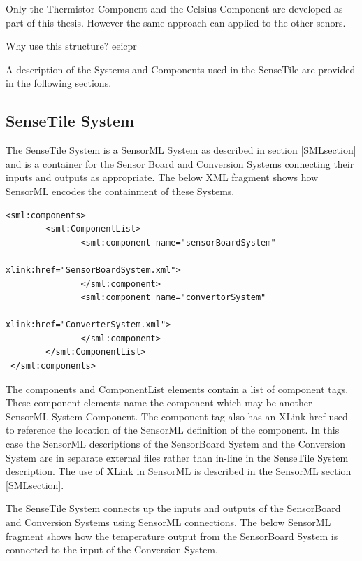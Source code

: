 \documentclass[]{final_report}
\begin{document}
Only the Thermistor Component and the Celsius Component are developed as part of this thesis. However the same approach can applied to the other senors.

Why use this structure? eeicpr

A description of the Systems and Components used in the SenseTile are provided in the following sections.

\subsection{SenseTile System}
The SenseTile System is a SensorML System as described in section \ref{SMLsection} and is a container for the Sensor Board and Conversion Systems connecting their inputs and outputs as appropriate. The below XML fragment shows how SensorML encodes the containment of these Systems. 
\lstset{language=XML,basicstyle=\scriptsize,frame=single}
\begin{lstlisting}
<sml:components>
        <sml:ComponentList>
               <sml:component name="sensorBoardSystem" 
                                          xlink:href="SensorBoardSystem.xml">
               </sml:component>
               <sml:component name="convertorSystem"  
                                          xlink:href="ConverterSystem.xml">
               </sml:component>
        </sml:ComponentList>			   
 </sml:components>
\end{lstlisting}
The components and ComponentList elements contain a list of component tags. These component elements name the component which may be another SensorML System  Component. The component tag also has an XLink href used to reference the location of the SensorML definition of the component.  In this case the SensorML descriptions of the SensorBoard System and the Conversion System are in separate external files rather than in-line in the SenseTile System description. The use of XLink in SensorML is described in the SensorML section \ref{SMLsection}.

The SenseTile System connects up the inputs and outputs of the SensorBoard and Conversion Systems using SensorML connections. The below SensorML fragment shows how the temperature output from the SensorBoard System is connected to the input of the Conversion System.
\end{document}
